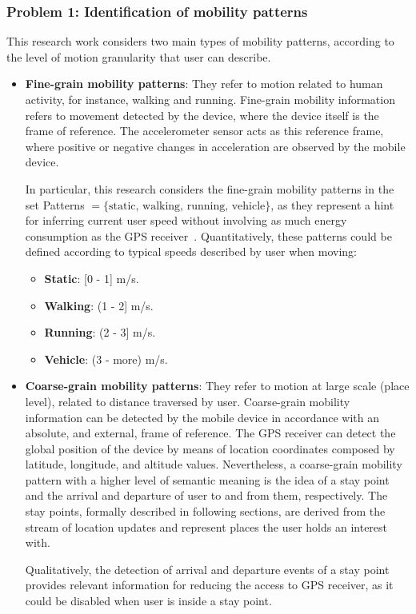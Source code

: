 \documentclass[ENG,PhD]{cinvestav}
\begin{document}
\subsubsection{Problem 1: Identification of mobility patterns}
\label{sub:problem-statement-problem-one}
This research work considers two main types of mobility patterns, according to the level of motion granularity that user can describe.
\begin{itemize}
  \item \textbf{Fine-grain mobility patterns}: They refer to motion related to human activity, for instance, walking and running.
  Fine-grain mobility information refers to movement detected by the device, where the device itself is the frame of reference.
  The accelerometer sensor acts as this reference frame, where positive or negative changes in acceleration are observed by the mobile device.

  In particular, this research considers the fine-grain mobility patterns in the set Patterns  $ = \{ \text{static, walking, running, vehicle} \}$, as they represent a hint for inferring current user speed without involving as much energy consumption as the GPS receiver~\cite{Abdesslem2009}.
  Quantitatively, these patterns could be defined according to typical speeds described by user when moving:
  \begin{itemize}
    \item \textbf{Static}: [0 - 1] m/s.
    \item \textbf{Walking}: (1 - 2] m/s.
    \item \textbf{Running}: (2 - 3] m/s. %
    \item \textbf{Vehicle}: (3 - more) m/s.
  \end{itemize}

  \item \textbf{Coarse-grain mobility patterns}: They refer to motion at large scale (place level), related to distance traversed by user.
  Coarse-grain mobility information can be detected by the mobile device in accordance with an absolute, and external, frame of reference.
  The GPS receiver can detect the global position of the device by means of location coordinates composed by latitude, longitude, and altitude values.
  Nevertheless, a coarse-grain mobility pattern with a higher level of semantic meaning is the idea of a stay point and the arrival and departure of user to and from them, respectively.
  The stay points, formally described in following sections, are derived from the stream of location updates and represent places the user holds an interest with.

  Qualitatively, the detection of arrival and departure events of a stay point provides relevant information for reducing the access to GPS receiver, as it could be disabled when user is inside a stay point.
\end{itemize}
\end{document}
